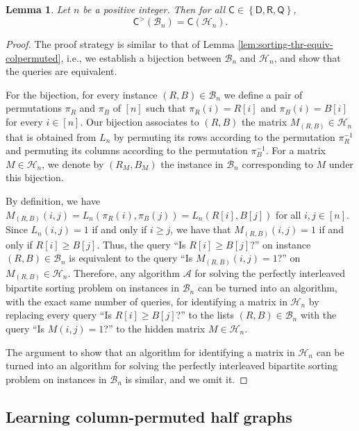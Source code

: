 \documentclass[11pt]{article}
\newcommand{\cA}{\mathcal{A}}
\newcommand{\cB}{\mathcal{B}}
\newcommand{\cH}{\mathcal{H}}
\newcommand{\sC}{\mathsf{C}}
\newcommand{\sD}{\mathsf{D}}
\newcommand{\sQ}{\mathsf{Q}}
\newcommand{\sR}{\mathsf{R}}
\newcommand{\cbra}[1]{\left\{#1\right\}}
\newtheorem{lemma}[theorem]{Lemma}
\begin{document}
\begin{lemma}\label{lem:bip-sorting-thr-equiv-permuted}
    Let $n$ be a positive integer. Then for all $\sC \in \cbra{\sD, \sR, \sQ}$,
    $$
    \sC^{>}(\cB_n) = \sC(\cH_n).
    $$
\end{lemma}
\begin{proof}
    The proof strategy is similar to that of Lemma \ref{lem:sorting-thr-equiv-colpermuted}, i.e., we establish a bijection between $\cB_n$ and $\cH_n$, and show that the queries are equivalent.

    For the bijection, for every instance $(R,B) \in \cB_n$ we define a pair of permutations $\pi_R$ and $\pi_B$ of $[n]$ such that $\pi_R(i) = R[i]$ and $\pi_B(i) = B[i]$ for every $i \in [n]$. Our bijection associates to $(R,B)$ the matrix $M_{(R,B)} \in \cH_n$ that is obtained from $L_n$ by permuting its rows according to the permutation $\pi_R^{-1}$ and permuting its columns according to the permutation $\pi_B^{-1}$. For a matrix $M \in \cH_n$, we denote by $(R_M,B_M)$ the instance in $\cB_n$ corresponding to $M$ under this bijection. 
    
    By definition, we have $M_{(R,B)}(i,j) = L_n(\pi_R(i),\pi_B(j)) = L_n(R[i],B[j])$ for all $i,j \in [n]$. Since $L_n(i,j) = 1$ if and only if $i \geq j$, we have that $M_{(R,B)}(i,j) = 1$ if and only if $R[i] \geq B[j]$. Thus, the query ``Is $R[i] \geq B[j]$?'' on instance $(R,B) \in \cB_n$ is equivalent to the query ``Is $M_{(R,B)}(i,j) = 1$?'' on $M_{(R,B)} \in \cH_n$.
    Therefore, any algorithm $\cA$ for solving the perfectly interleaved bipartite sorting problem on instances in $\cB_n$ can be turned into an algorithm, with the exact same number of queries, for identifying a matrix in $\cH_n$ by replacing every query ``Is $R[i] \geq B[j]$?'' to the lists $(R,B) \in \cB_n$ with the query ``Is $M(i,j) = 1$?'' to the hidden matrix $M \in \cH_n$. 

    The argument to show that an algorithm for identifying a matrix in $\cH_n$ can be turned into an algorithm for solving the perfectly interleaved bipartite sorting problem on instances in $\cB_n$ is similar, and we omit it.
\end{proof}



\subsection{Learning column-permuted half graphs}\label{subsec:column-permuted-half-graph-learning}
\end{document}

